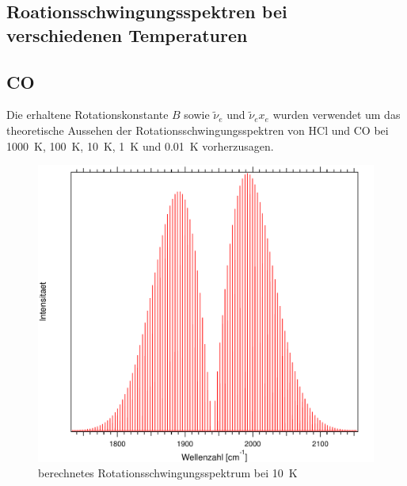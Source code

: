 \subsection{Roationsschwingungsspektren bei verschiedenen Temperaturen}
\subsection*{CO}

Die erhaltene Rotationskonstante $B$ sowie $\tilde{\nu}_e$ und $\tilde{\nu}_e x_e$ wurden verwendet um das theoretische Aussehen der Rotationsschwingungsspektren von HCl und CO bei \SI[mode=math]{1000}{K}, \SI[mode=math]{100}{K}, \SI[mode=math]{10}{K}, \SI[mode=math]{1}{K} und \SI[mode=math]{0.01}{K} vorherzusagen.

\begin{figure}[H]
\centering	
	\begin{minipage}{0.8\linewidth}
	\includegraphics[width=\linewidth]{Bilder/1000CO.pdf}
	\caption{berechnetes Rotationsschwingungsspektrum bei 10~K}
	\end{minipage}

	
	
	
	\label{Rot:1000CO}
\end{figure}

